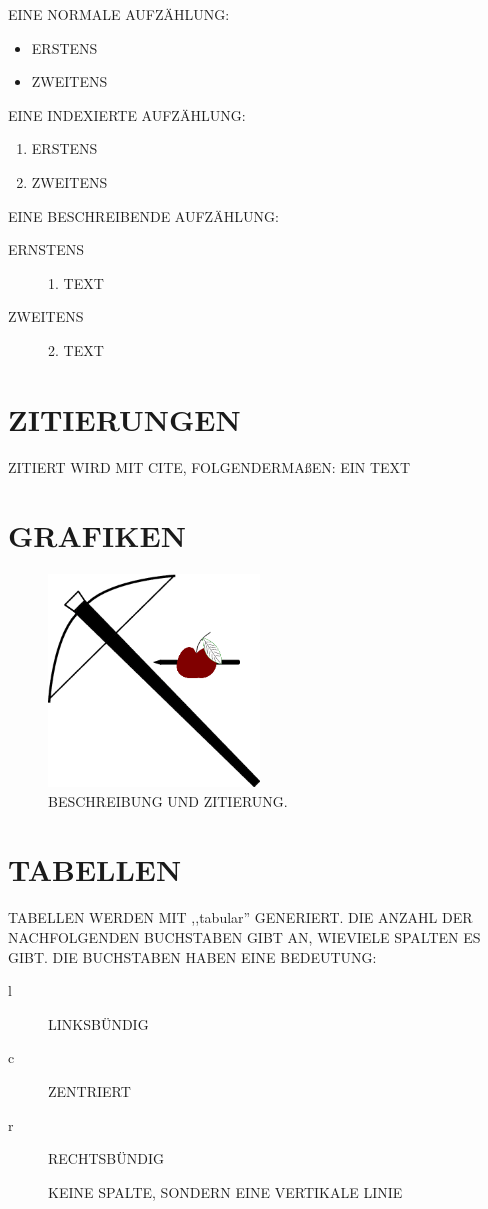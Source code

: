 \documentclass[conference,compsocl]{IEEEtran}
\begin{document}
EINE NORMALE AUFZÄHLUNG:
\begin{itemize}
\item ERSTENS
\item ZWEITENS
\end{itemize}

EINE INDEXIERTE AUFZÄHLUNG:
\begin{enumerate}
\item ERSTENS
\item ZWEITENS
\end{enumerate}

EINE BESCHREIBENDE AUFZÄHLUNG:
\begin{description}
\item[ERNSTENS] 1. TEXT
  \item[ZWEITENS] 2. TEXT
\end{description}

\section{ZITIERUNGEN}
ZITIERT WIRD MIT CITE, FOLGENDERMAßEN: EIN TEXT\cite{RUTH09}

\section{GRAFIKEN}
\begin{figure}[H]
  \centering
  \includegraphics[width=0.5\textwidth]{image.png}
  \caption{BESCHREIBUNG UND ZITIERUNG\cite{STEIG}.}
  \label{fig:image} %
\end{figure}
\FloatBarrier %

\section{TABELLEN}
TABELLEN WERDEN MIT ,,tabular'' GENERIERT. DIE ANZAHL DER NACHFOLGENDEN
BUCHSTABEN GIBT AN, WIEVIELE SPALTEN ES GIBT. DIE BUCHSTABEN HABEN
EINE BEDEUTUNG:
\begin{description}
\item[l] LINKSBÜNDIG
\item[c] ZENTRIERT
\item[r] RECHTSBÜNDIG
\item[\textbar] KEINE SPALTE, SONDERN EINE VERTIKALE LINIE
\end{description}
\end{document}
